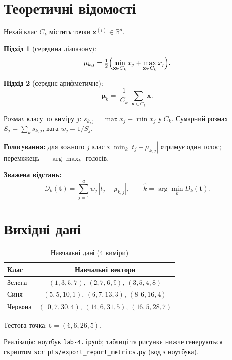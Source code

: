 \documentclass[14pt,a4paper,oneside]{extarticle}
\begin{document}
\section{Теоретичні відомості}

Нехай клас $C_k$ містить точки $\mathbf{x}^{(i)}\in\mathbb{R}^d$.

\textbf{Підхід 1} (середина діапазону):
\begin{equation}
  \mu_{k,j}=\tfrac{1}{2}\Bigl(\min_{\mathbf{x}\in C_k} x_j + \max_{\mathbf{x}\in C_k} x_j\Bigr).
\end{equation}

\textbf{Підхід 2} (середнє арифметичне):
\begin{equation}
  \boldsymbol{\mu}_k = \frac{1}{|C_k|}\sum_{\mathbf{x}\in C_k}\mathbf{x}.
\end{equation}

Розмах класу по виміру $j$: $s_{k,j}=\max x_j-\min x_j$ у $C_k$. Сумарний розмах $S_j=\sum_k s_{k,j}$, вага $w_j=1/S_j$.

\textbf{Голосування:} для кожного $j$ клас з $\min_k |t_j-\mu_{k,j}|$ отримує один голос; переможець --- $\arg\max_k$ голосів.

\textbf{Зважена відстань:}
\begin{equation}
  D_k(\mathbf{t})=\sum_{j=1}^{d} w_j\,|t_j-\mu_{k,j}|,\qquad
  \hat{k}=\arg\min_k D_k(\mathbf{t}).
\end{equation}

\section{Вихідні дані}

\begin{table}[H]
\centering
\renewcommand{\arraystretch}{1.1}
\begin{tabular}{|l|c|}
\hline
\textbf{Клас} & \textbf{Навчальні вектори} \\
\hline
Зелена & $(1,3,5,7)$, $(2,7,6,9)$, $(3,5,4,8)$ \\
\hline
Синя & $(5,5,10,1)$, $(6,7,13,3)$, $(8,6,16,4)$ \\
\hline
Червона & $(10,7,30,4)$, $(14,6,31,5)$, $(16,5,28,7)$ \\
\hline
\end{tabular}
\caption{Навчальні дані (4 виміри)}
\label{tab:lab4data}
\end{table}

Тестова точка: $\mathbf{t}=(6,6,26,5)$.

Реалізація: ноутбук \texttt{lab-4.ipynb}; таблиці та рисунки нижче генеруються скриптом \texttt{scripts/export\_report\_metrics.py} (код з ноутбука).
\end{document}
